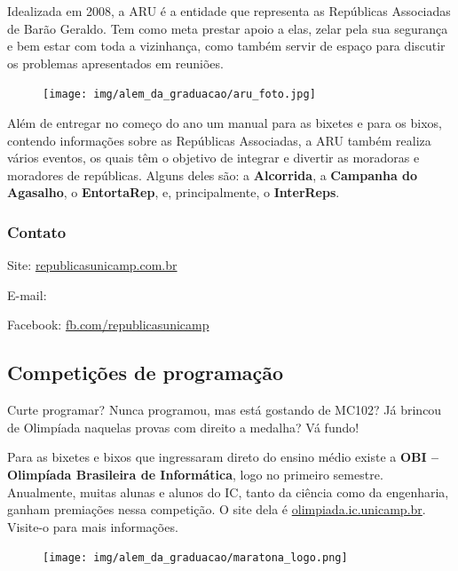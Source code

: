 Idealizada em 2008, a ARU é a entidade que representa as Repúblicas Associadas
de Barão Geraldo. Tem como meta prestar apoio a elas, zelar pela sua segurança
e bem estar com toda a vizinhança, como também servir de espaço para discutir
os problemas apresentados em reuniões.

\begin{figure}[H]
  \centering
  \texttt{[image: img/alem\_da\_graduacao/aru\_foto.jpg]}
\end{figure}

Além de entregar no começo do ano um manual para as bixetes e para os bixos,
contendo informações sobre as Repúblicas Associadas, a ARU também realiza
vários eventos, os quais têm o objetivo de integrar e divertir as moradoras e
moradores de repúblicas. Alguns deles são: a \textbf{Alcorrida}, a
\textbf{Campanha do Agasalho}, o \textbf{EntortaRep}, e, principalmente, o
\textbf{InterReps}.

\subsubsection{Contato}

\begin{compactitemize}
\item Site: \url{republicasunicamp.com.br}
\item E-mail: 
\item Facebook: \url{fb.com/republicasunicamp}
\end{compactitemize}

\subsection{Competições de programação}

Curte programar? Nunca programou, mas está gostando de MC102? Já brincou de
Olimpíada naquelas provas com direito a medalha? Vá fundo!

Para as bixetes e bixos que ingressaram direto do ensino médio existe a
\textbf{OBI --Olimpíada Brasileira de Informática}, logo no primeiro semestre.
Anualmente, muitas alunas e alunos do IC, tanto da ciência como da engenharia,
ganham premiações nessa competição. O site dela é
\url{olimpiada.ic.unicamp.br}. Visite-o para mais informações.

\begin{figure}[h!]
  \centering
  \texttt{[image: img/alem\_da\_graduacao/maratona\_logo.png]}
\end{figure}

